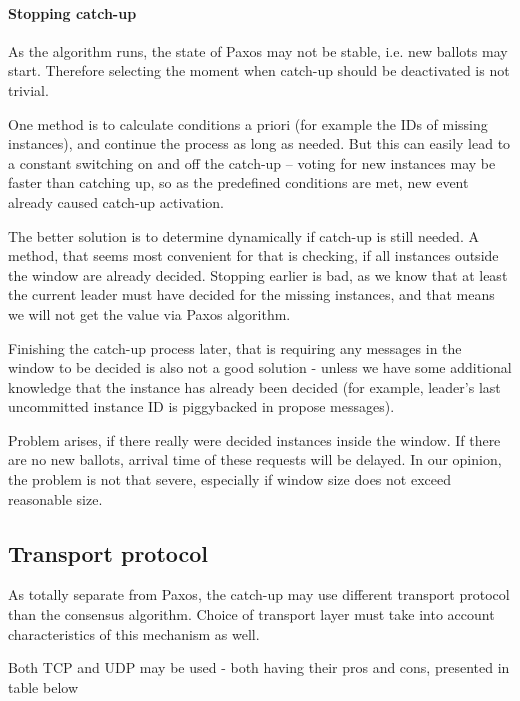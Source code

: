 \paragraph*{Stopping catch-up} As the algorithm runs, the state of Paxos may not be stable, i.e. new ballots may start. Therefore selecting the moment when catch-up should be deactivated is not trivial.

One method is to calculate conditions a priori (for example the IDs of missing instances), and continue the process as long as needed. But this can easily lead to a constant switching on and off the catch-up -- voting for new instances may be faster than catching up, so as the predefined conditions are met, new event already caused catch-up activation.

The better solution is to determine dynamically if catch-up is still needed. A method, that seems most convenient for that is checking, if all instances outside the window are already decided. Stopping earlier is bad, as we know that at least the current leader must have decided for the missing instances, and that means we will not get the value via Paxos algorithm.

Finishing the catch-up process later, that is requiring any messages in the window to be decided is also not a good solution - unless we have some additional knowledge that the instance has already been decided (for example, leader's last uncommitted instance ID is piggybacked in propose messages).

Problem arises, if there really were decided instances inside the window. If there are no new ballots, arrival time of these requests will be delayed. In our opinion, the problem is not that severe, especially if window size does not exceed reasonable size.

\subsection{Transport protocol}
\label{subsec:transport_protocole}
As totally separate from Paxos, the catch-up may use different transport protocol than the consensus algorithm.
Choice of transport layer must take into account characteristics of this mechanism as well.

Both TCP and UDP may be used - both having their pros and cons, presented in table below

